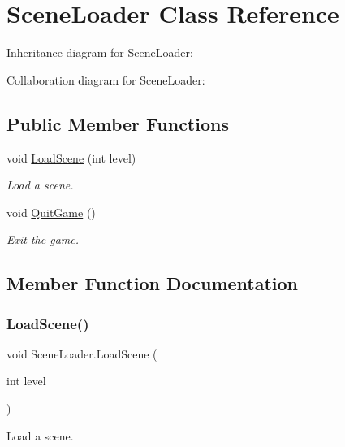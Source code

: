 \hypertarget{class_scene_loader}{}\section{Scene\+Loader Class Reference}
\label{class_scene_loader}


Inheritance diagram for Scene\+Loader\+:


Collaboration diagram for Scene\+Loader\+:
\subsection*{Public Member Functions}
\begin{DoxyCompactItemize}
\item 
void \mbox{\hyperlink{class_scene_loader_a2cb6f7a1f1336315a297adcac195c05a}{Load\+Scene}} (int level)
\begin{DoxyCompactList}\small\item\em Load a scene. \end{DoxyCompactList}\item 
void \mbox{\hyperlink{class_scene_loader_a6e71b5a31f735d3187e8375383bdfe5d}{Quit\+Game}} ()
\begin{DoxyCompactList}\small\item\em Exit the game. \end{DoxyCompactList}\end{DoxyCompactItemize}


\subsection{Member Function Documentation}
\mbox{\label{class_scene_loader_a2cb6f7a1f1336315a297adcac195c05a}} 
\subsubsection{\texorpdfstring{Load\+Scene()}{LoadScene()}}
{\footnotesize\ttfamily void Scene\+Loader.\+Load\+Scene (\begin{DoxyParamCaption}\item[{int}]{level }\end{DoxyParamCaption})}



Load a scene. 


